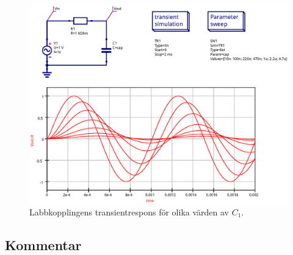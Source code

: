 \begin{figure}[ht]
    \centering
    \includegraphics[width=\linewidth]{sim/ee466_lab-4_prj/uppgift-1_param}
    \caption[] {Labbkopplingens transientrespons för olika värden av $C_1$.}
    \label{bode-sim-tran}
\end{figure}


\subsection{Kommentar}\label{}


